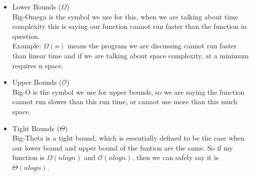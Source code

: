 \documentclass{article}
\begin{document}
\begin{itemize}
    \item Lower Bounds ($\Omega$) \\
        Big-Omega is the symbol we use for this, when we are talking about time complexity this is saying our function cannot run faster than the function in question. \\
        Example: $\Omega(n)$ means the program we are discussing cannot run faster than linear time and if we are talking about space complexity, at a minimum requires n space. 
    \item Upper Bounds ($\mathcal{O}$) \\
        Big-O is the symbol we use for upper bounds, so we are saying the function cannot run slower than this run time, or cannot use more than this much space. 
    \item Tight Bounds ($\Theta$) \\
        Big-Theta is a tight bound, which is essentially defined to be the case when our lower bound and upper bound of the funtion are the same. So if my function is $\Omega(nlogn)$ and $\mathcal{O}(nlogn)$, then we can safely say it is $\Theta(nlogn)$.
    
\end{itemize}
\end{document}
